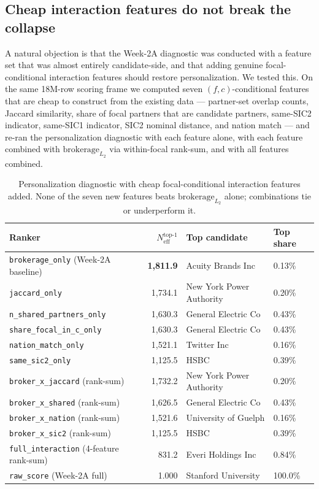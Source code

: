 \documentclass[11pt,letterpaper]{article}
\begin{document}
\subsection{Cheap interaction features do not break the collapse}
\label{sec:interaction-features}

A natural objection is that the Week-2A diagnostic was conducted with
a feature set that was almost entirely candidate-side, and that adding
genuine focal-conditional interaction features should restore
personalization.  We tested this.  On the same 18M-row scoring frame
we computed seven $(f, c)$-conditional features that are cheap to
construct from the existing data --- partner-set overlap counts,
Jaccard similarity, share of focal partners that are candidate
partners, same-SIC2 indicator, same-SIC1 indicator, SIC2 nominal
distance, and nation match --- and re-ran the personalization
diagnostic with each feature alone, with each feature combined with
$\text{brokerage}_{L_2}$ via within-focal rank-sum, and with all
features combined.

\begin{table}[H]
\centering
\footnotesize
\caption{Personalization diagnostic with cheap focal-conditional
interaction features added.  None of the seven new features beats
$\text{brokerage}_{L_2}$ alone; combinations tie or underperform it.}
\label{tab:interaction}
\begin{tabular}{lrll}
\toprule
Ranker & $N_{\mathrm{eff}}^{\text{top-1}}$ & Top candidate & Top share \\
\midrule
\texttt{brokerage\_only} (Week-2A baseline) & \textbf{1{,}811.9} & Acuity Brands Inc & 0.13\% \\
\texttt{jaccard\_only}                & 1{,}734.1 & New York Power Authority & 0.20\% \\
\texttt{n\_shared\_partners\_only}    & 1{,}630.3 & General Electric Co      & 0.43\% \\
\texttt{share\_focal\_in\_c\_only}    & 1{,}630.3 & General Electric Co      & 0.43\% \\
\texttt{nation\_match\_only}          & 1{,}521.1 & Twitter Inc              & 0.16\% \\
\texttt{same\_sic2\_only}             & 1{,}125.5 & HSBC                     & 0.39\% \\
\texttt{broker\_x\_jaccard} (rank-sum)  & 1{,}732.2 & New York Power Authority & 0.20\% \\
\texttt{broker\_x\_shared} (rank-sum)   & 1{,}626.5 & General Electric Co      & 0.43\% \\
\texttt{broker\_x\_nation} (rank-sum)   & 1{,}521.6 & University of Guelph     & 0.16\% \\
\texttt{broker\_x\_sic2} (rank-sum)     & 1{,}125.5 & HSBC                     & 0.39\% \\
\texttt{full\_interaction} (4-feature rank-sum) & 831.2 & Everi Holdings Inc & 0.84\% \\
\texttt{raw\_score} (Week-2A full)    & 1.000 & Stanford University & 100.0\% \\
\bottomrule
\end{tabular}
\end{table}
\end{document}
